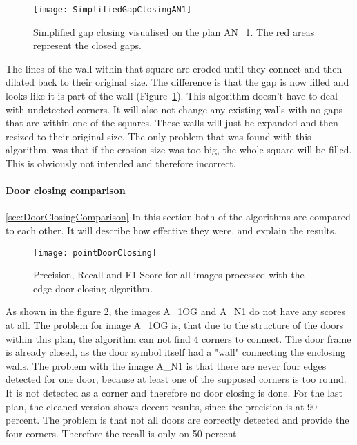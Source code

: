 \begin{figure}[H]
	\centering
	\texttt{[image: SimplifiedGapClosingAN1]}
	\caption{Simplified gap closing visualised on the plan AN\_1. The red areas represent the closed gaps.}
	\label{fig:SimplifiedGapClosingAN1}
\end{figure}

The lines of the wall within that square are eroded until they connect and then dilated back to their original size. The difference is that the gap is now filled and looks like it is part of the wall (Figure~\ref{fig:SimplifiedGapClosingAN1}). This algorithm doesn't have to deal with undetected corners. It will also not change any existing walls with no gaps that are within one of the squares. These walls will just be expanded and then resized to their original size. The only problem that was found with this algorithm, was that if the erosion size was too big, the whole square will be filled. This is obviously not intended and therefore incorrect.

\paragraph{Door closing comparison}
\ref{sec:DoorClosingComparison}
In this section both of the algorithms are compared to each other. It will describe how effective they were, and explain the results.

\begin{figure}[H]
	\centering
	\texttt{[image: pointDoorClosing]}
	\caption{Precision, Recall and F1-Score for all images processed with the edge door closing algorithm. }
	\label{fig:pointDoorClosing}
\end{figure}

As shown in the figure \ref{fig:pointDoorClosing}, the images A\_1OG and A\_N1 do not have any scores at all. The problem for image A\_1OG is, that due to the structure of the doors within this plan, the algorithm can not find 4 corners to connect. The door frame is already closed, as the door symbol itself had a "wall" connecting the enclosing walls. The problem with the image A\_N1 is that there are never four edges detected for one door, because at least one of the supposed corners is too round. It is not detected as a corner and therefore no door closing is done. For the last plan, the cleaned version shows decent results, since the precision is at 90 percent. The problem is that not all doors are correctly detected and provide the four corners. Therefore the recall is only on 50 percent.

